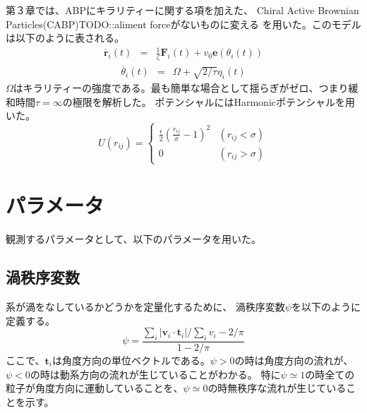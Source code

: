 \documentclass[/Users/ikedahajime/GitHub/reserch/master_report/thesis]{subfiles}
\begin{document}
第３章では、ABPにキラリティーに関する項を加えた、 Chiral Active Brownian Particles(CABP)\cite{teeffelenDynamicsBrownianCircle2008}TODO::aliment forceがないものに変える を用いた。このモデルは以下のように表される。
\begin{eqnarray}
    \dot{\bm{r}_i}(t) &=& \frac{1}{\zeta} \bm{F}_i(t)+v_0 \bm{e}(\theta_i (t))
\end{eqnarray}
\begin{eqnarray}
    \dot{\theta_i }(t) &=& \Omega+\sqrt{2/\tau}\eta_i(t)
\end{eqnarray}
$\Omega$はキラリティーの強度である。最も簡単な場合として揺らぎがゼロ、つまり緩和時間$\tau=\infty$の極限を解析した。
ポテンシャルにはHarmonicポテンシャルを用いた。
\begin{equation}
    U(r_{ij})=
    \begin{cases}
        \frac{\epsilon}{2}\left(\frac{r_{ij}}{\sigma}-1\right)^2 &(r_{ij}<\sigma)\\
        0 & (r_{ij}>\sigma)

    \end{cases}
\end{equation}

\section{パラメータ}
観測するパラメータとして、以下のパラメータを用いた。
\subsection{渦秩序変数}\label{subsec:vortes_order_parameter}
系が渦をなしているかどうかを定量化するために、
渦秩序変数$\psi$\cite{wiolandConfinementStabilizesBacterial2013}を以下のように定義する。
\begin{equation}
    \psi=\frac{\sum_i \left|\bm{v}_i\cdot \bm{t}_i \right|/\sum_i v_i -2/\pi}{1-2/\pi}
\end{equation}
ここで、$\bm{t}_i$は角度方向の単位ベクトルである。$\psi>0$の時は角度方向の流れが、$\psi<0$の時は動系方向の流れが生じていることがわかる。
特に$\psi\simeq1$の時全ての粒子が角度方向に運動していることを、$\psi\simeq0$の時無秩序な流れが生じていることを示す。
\end{document}
